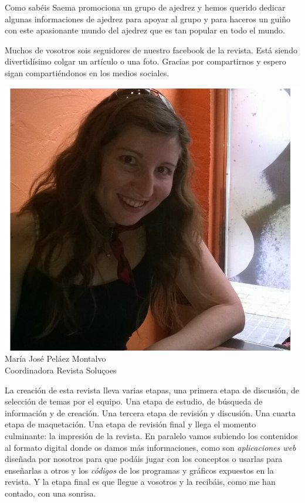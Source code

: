 \begin{multicols}{2}
  Como sabéis Saema promociona un grupo de ajedrez y hemos querido
  dedicar algunas informaciones de ajedrez para apoyar al grupo y para
  haceros un guiño con este apasionante mundo del ajedrez que es tan
  popular en todo el mundo.


  Muchos de vosotros  sois seguidores de nuestro facebook de la
  revista. Está siendo divertidísimo colgar un artículo o una foto.
  Gracias por compartirnos y espero sigan
  compartiéndonos en los medios sociales.

   \begin{figurebox}
       \centering
  \includegraphics[scale=0.29]{maria.png}\\
    María José Peláez Montalvo\\ 
    {\small Coordinadora Revista Soluçoes}\\
    \vspace{1pt}
  \end{figurebox}
\vspace{1cm}
  La creación de esta revista lleva varias etapas, una primera etapa
  de discusión, de selección de temas por el equipo. Una etapa de
  estudio, de búsqueda de información y de creación. Una tercera etapa
  de revisión y discusión. Una cuarta etapa de maquetación. Una etapa
  de revisión final y llega el momento culminante: la impresión de la
  revista. En paralelo vamos subiendo los contenidos al formato
  digital donde os damos más informaciones, como son \emph{aplicaciones web}
  diseñada por nosotros para que podáis jugar con los conceptos o
  usarlas para enseñarlas a otros y los \emph{códigos} de los programas y
  gráficos expuestos en la revista. Y la etapa final es que llegue a
  vosotros y la recibáis, como me han contado, con una sonrisa.


\end{multicols}
